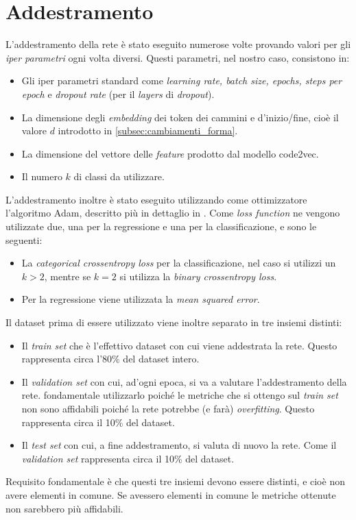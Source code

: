 \section{Addestramento}
L'addestramento della rete è stato eseguito numerose volte provando valori per gli \textit{iper parametri} ogni volta diversi. 
Questi parametri, nel nostro caso, consistono in:
    \begin{itemize}
        \item Gli iper parametri standard come \textit{learning rate, batch size, epochs, steps per epoch} e \textit{dropout rate} (per il \textit{layers} di \textit{dropout}).
        \item La dimensione degli \textit{embedding} dei token dei cammini e d'inizio/fine, cioè il valore $d$ introdotto in \autoref{subsec:cambiamenti_forma}.
        \item La dimensione del vettore delle \textit{feature} prodotto dal modello code2vec.
        \item Il numero $k$ di classi da utilizzare. 
    \end{itemize}
L'addestramento inoltre è stato eseguito utilizzando come ottimizzatore l'algoritmo Adam, descritto più in dettaglio in \cite{kingma2014adam}. 
Come \textit{loss function} ne vengono utilizzate due, una per la regressione e una per la classificazione, e sono le seguenti:
    \begin{itemize}
        \item La \textit{categorical crossentropy loss} per la classificazione, nel caso si utilizzi un $k>2$, mentre se $k=2$ si utilizza la \textit{binary crossentropy loss}.
        \item Per la regressione viene utilizzata la \textit{mean squared error}.
    \end{itemize}
Il dataset prima di essere utilizzato viene inoltre separato in tre insiemi distinti:
    \begin{itemize}
        \item Il \textit{train set} che è l'effettivo dataset con cui viene addestrata la rete. Questo rappresenta circa l'80\% del dataset intero.
        \item Il \textit{validation set} con cui, ad'ogni epoca, si va a valutare l'addestramento della rete. \Eaccentata{} fondamentale utilizzarlo poiché le metriche che si ottengo sul \textit{train set} non sono affidabili
                poiché la rete potrebbe (e farà) \textit{overfitting}. Questo rappresenta circa il 10\% del dataset.
        \item Il \textit{test set} con cui, a fine addestramento, si valuta di nuovo la rete. Come il \textit{validation set} rappresenta circa il 10\% del dataset.
    \end{itemize}
Requisito fondamentale è che questi tre insiemi devono essere distinti, e cioè non avere elementi in comune. 
Se avessero elementi in comune le metriche ottenute non sarebbero più affidabili. 

